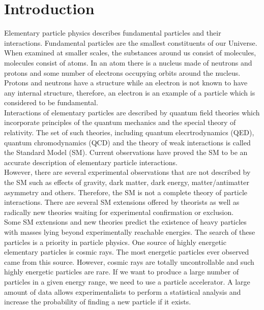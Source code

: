 \section{Introduction}
\label{sec:intro}

Elementary particle physics describes fundamental particles and their interactions. Fundamental particles are the smallest constituents of our Universe. When examined at smaller scales, the substances around us consist of molecules, molecules consist of atoms. In an atom there is a nucleus made of neutrons and protons and some number of electrons occupying orbits around the nucleus. Protons and neutrons have a structure while an electron is not known to have any internal structure, therefore, an electron is an example of a particle which is considered to be fundamental.\\

Interactions of elementary particles are described by quantum field theories which incorporate principles of the quantum mechanics and the special theory of relativity. The set of such theories, including quantum elecrtrodynamics (QED), quantum chromodynamics (QCD) and the theory of weak interactions is called the Standard Model (SM). Current observations have proved the SM to be an accurate description of elementary particle interactions. \\ 

However, there are several experimental observations that are not described by the SM such as effects of gravity, dark matter, dark energy, matter/antimatter asymmetry and others. Therefore, the SM is not a complete theory of particle interactions. There are several SM extensions offered by theorists as well as radically new theories waiting for experimental confirmation or exclusion. \\

Some SM extensions and new theories predict the existence of heavy particles with masses lying beyond experimentally reachable energies. The search of these particles is a priority in particle physics. One source of highly energetic elementary particles is cosmic rays. The most energetic particles ever observed came from this source. However, cosmic rays are totally uncontrollable and such highly energetic particles are rare. If we want to produce a large number of particles in a given energy range, we need to use a particle accelerator. A large amount of data allows experimentalists to perform a statistical analysis and increase the probability of finding a new particle if it exists.\\

